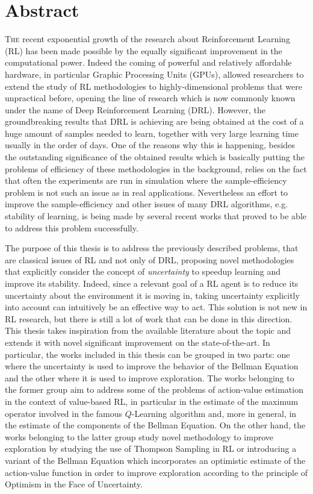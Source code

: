 \chapter*{Abstract}
\lettrine{T}{he} recent exponential growth of the research about Reinforcement Learning (RL) has been made possible by the equally significant improvement in the computational power. Indeed the coming of powerful and relatively affordable hardware, in particular Graphic Processing Units (GPUs), allowed researchers to extend the study of RL methodologies to highly-dimensional problems that were unpractical before, opening the line of research which is now commonly known under the name of Deep Reinforcement Learning (DRL). However, the groundbreaking results that DRL is achieving are being obtained at the cost of a huge amount of samples needed to learn, together with very large learning time usually in the order of days. One of the reasons why this is happening, besides the outstanding significance of the obtained results which is basically putting the problems of efficiency of these methodologies in the background, relies on the fact that often the experiments are run in simulation where the sample-efficiency problem is not such an issue as in real applications. Nevertheless an effort to improve the sample-efficiency and other issues of many DRL algorithms, e.g. stability of learning, is being made by several recent works that proved to be able to address this problem successfully.

The purpose of this thesis is to address the previously described problems, that are classical issues of RL and not only of DRL, proposing novel methodologies that explicitly consider the concept of \textit{uncertainty} to speedup learning and improve its stability. Indeed, since a relevant goal of a RL agent is to reduce its uncertainty about the environment it is moving in, taking uncertainty explicitly into account can intuitively be an effective way to act. This solution is not new in RL research, but there is still a lot of work that can be done in this direction. This thesis takes inspiration from the available literature about the topic and extends it with novel significant improvement on the state-of-the-art. In particular, the works included in this thesis can be grouped in two parts: one where the uncertainty is used to improve the behavior of the Bellman Equation and the other where it is used to improve exploration. The works belonging to the former group aim to address some of the problems of action-value estimation in the context of value-based RL, in particular in the estimate of the maximum operator involved in the famous $Q$-Learning algorithm and, more in general, in the estimate of the components of the Bellman Equation. On the other hand, the works belonging to the latter group study novel methodology to improve exploration by studying the use of Thompson Sampling in RL or introducing a variant of the Bellman Equation which incorporates an optimistic estimate of the action-value function in order to improve exploration according to the principle of Optimism in the Face of Uncertainty.

